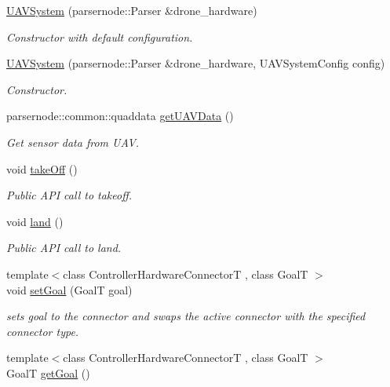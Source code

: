 \begin{DoxyCompactItemize}
\item 
\hyperlink{classUAVSystem_a99ac3986113a03546b8dc4bcc73d65b0}{U\-A\-V\-System} (parsernode\-::\-Parser \&drone\-\_\-hardware)
\begin{DoxyCompactList}\small\item\em Constructor with default configuration. \end{DoxyCompactList}\item 
\hyperlink{classUAVSystem_a9218f794905e832cc356b5e4b659e1da}{U\-A\-V\-System} (parsernode\-::\-Parser \&drone\-\_\-hardware, U\-A\-V\-System\-Config config)
\begin{DoxyCompactList}\small\item\em Constructor. \end{DoxyCompactList}\item 
parsernode\-::common\-::quaddata \hyperlink{classUAVSystem_a8a1cbcd8770841ee2a30365f4a75bf34}{get\-U\-A\-V\-Data} ()
\begin{DoxyCompactList}\small\item\em Get sensor data from U\-A\-V. \end{DoxyCompactList}\item 
void \hyperlink{classUAVSystem_a7f010477b67bfeb5d6d32c0f10630b8e}{take\-Off} ()
\begin{DoxyCompactList}\small\item\em Public A\-P\-I call to takeoff. \end{DoxyCompactList}\item 
void \hyperlink{classUAVSystem_ae1bac31ca121a54cb1e3ed7fac322993}{land} ()
\begin{DoxyCompactList}\small\item\em Public A\-P\-I call to land. \end{DoxyCompactList}\item 
{\footnotesize template$<$class Controller\-Hardware\-Connector\-T , class Goal\-T $>$ }\\void \hyperlink{classUAVSystem_a6aae5b94424be17ed6bafeaa4f64f416}{set\-Goal} (Goal\-T goal)
\begin{DoxyCompactList}\small\item\em sets goal to the connector and swaps the active connector with the specified connector type. \end{DoxyCompactList}\item 
{\footnotesize template$<$class Controller\-Hardware\-Connector\-T , class Goal\-T $>$ }\\Goal\-T \hyperlink{classUAVSystem_a5381ca45049c8c92e872a80a2974339b}{get\-Goal} ()

\end{DoxyCompactItemize}
